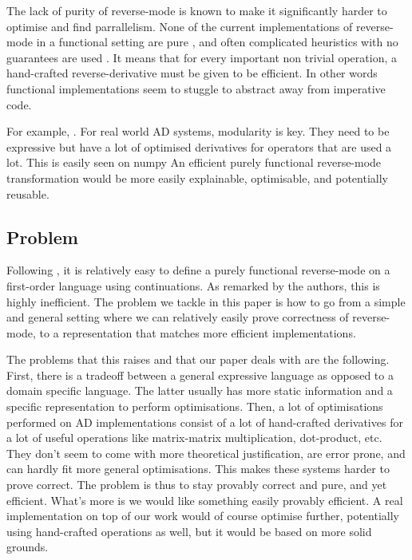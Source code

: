 The lack of purity of reverse-mode is known to make it significantly harder to optimise and find parrallelism. 
None of the current implementations of reverse-mode in a functional setting are pure \cite{}, and often complicated heuristics with no guarantees are used \cite{}.
It means that for every important non trivial operation, a hand-crafted reverse-derivative must be given to be efficient.
In other words functional implementations seem to stuggle to abstract away from imperative code.

For example, .
For real world AD systems, modularity is key. They need to be expressive but have a lot of optimised derivatives for operators that are used a lot.
This is easily seen on numpy 
An efficient purely functional reverse-mode transformation would be more easily explainable, optimisable, and potentially reusable.

\subsection{Problem}

Following \cite{pearlmutter2008reverse}, it is relatively easy to define a purely functional reverse-mode on a first-order language using continuations. 
As remarked by the authors, this is highly inefficient. 
The problem we tackle in this paper is how to go from a simple and general setting where we can relatively easily prove correctness of reverse-mode, 
to a representation that matches more efficient implementations.

The problems that this raises and that our paper deals with are the following. First, there is a tradeoff between a general expressive language 
as opposed to a domain specific language. The latter usually has more static information and a specific representation to perform optimisations.
Then, a lot of optimisations performed on AD implementations consist of a lot of hand-crafted derivatives for a lot of useful operations like matrix-matrix multiplication, dot-product, etc.
They don't seem to come with more theoretical justification, are error prone, and can hardly fit more general optimisations.
This makes these systems harder to prove correct. The problem is thus to stay provably correct and pure, and yet efficient. What's more is we would like something easily provably efficient. 
A real implementation on top of our work would of course optimise further, potentially using hand-crafted operations as well, but it would be based on more solid grounds.

